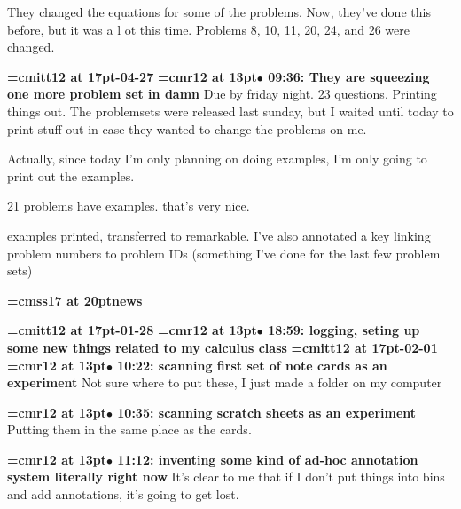 They changed the equations for some of the problems. Now, they've done this before, but it was a l ot this time. Problems 8, 10, 11, 20, 24, and 26 were changed.
\par

{\medskip\noindent\bf\font\titlefont=cmitt12 at 17pt-04-27}\medskip
{\smallskip\noindent\bf\font\titlefont=cmr12 at 13pt\titlefont $\bullet$ 09:36: They are squeezing one more problem set in damn}\smallskip
Due by friday night. 23 questions. Printing things out. The problemsets were released last sunday, but I waited until today to print stuff out in case they wanted to change the problems on me.
\par

Actually, since today I'm only planning on doing examples, I'm only going to print out the examples.
\par

21 problems have examples. that's very nice.
\par

examples printed, transferred to remarkable. I've also annotated a key linking problem numbers to problem IDs (something I've done for the last few problem sets)
\par

{\medskip\noindent\bf\font\titlefont=cmss17 at 20pt\titlefont news}\medskip

{\medskip\noindent\bf\font\titlefont=cmitt12 at 17pt-01-28}\medskip
{\smallskip\noindent\bf\font\titlefont=cmr12 at 13pt\titlefont $\bullet$ 18:59: logging, seting up some new things related to my calculus class}\smallskip
{\medskip\noindent\bf\font\titlefont=cmitt12 at 17pt-02-01}\medskip
{\smallskip\noindent\bf\font\titlefont=cmr12 at 13pt\titlefont $\bullet$ 10:22: scanning first set of note cards as an experiment}\smallskip
Not sure where to put these, I just made a folder on my computer
\par

{\smallskip\noindent\bf\font\titlefont=cmr12 at 13pt\titlefont $\bullet$ 10:35: scanning scratch sheets as an experiment}\smallskip
Putting them in the same place as the cards.
\par

{\smallskip\noindent\bf\font\titlefont=cmr12 at 13pt\titlefont $\bullet$ 11:12: inventing some kind of ad-hoc annotation system literally right now}\smallskip
It's clear to me that if I don't put things into bins and add annotations, it's going to get lost.
\par

